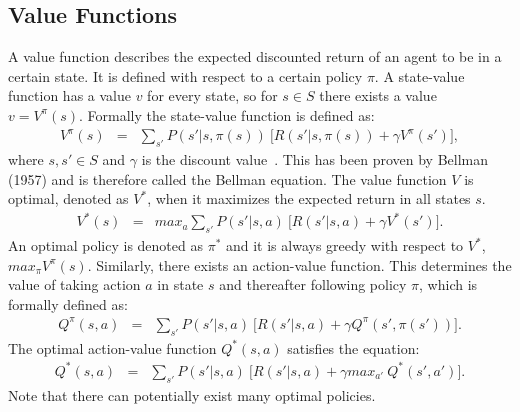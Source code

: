 \subsection{Value Functions}
A value function describes the expected discounted return of an agent to be in a certain
state. It is defined with respect to a certain policy $\pi$. A state-value
function has a value $v$ for every state, so for $s \in S$ there exists a value
$v = V^\pi(s)$. Formally the state-value function is defined as:
\begin{eqnarray}
V^\pi(s) & = & \sum_{s'} P(s'|s,\pi(s)) ~ \Big[R(s'|s,\pi(s)) + \gamma V^\pi(s')\Big],
\end{eqnarray}
where $s,s' \in S$ and $\gamma$ is the discount value~\cite{sutton}. This has
been proven by Bellman (1957) and is therefore called the Bellman equation. The
value function $V$ is optimal, denoted as $V^*$, when it maximizes the expected
return in all states $s$.
\begin{eqnarray}
V^*(s) & = & max_a \sum_{s'} P(s'|s,a) ~ \Big[R(s'|s,a) + \gamma V^*(s')\Big].
\end{eqnarray}
An optimal policy is denoted as $\pi^*$ and it is always greedy with respect to
$V^*$, $max_\pi V^\pi(s)$.  Similarly, there exists an action-value function.
This determines the value of taking action $a$ in state $s$ and thereafter
following policy $\pi$, which is formally defined as:
\begin{eqnarray}
Q^\pi(s,a) & = & \sum_{s'} P(s'|s,a) ~ \Big[R(s'|s,a) + \gamma Q^\pi(s',\pi(s'))\Big].
\end{eqnarray}
The optimal action-value function $Q^*(s,a)$ satisfies the equation:
\begin{eqnarray}
Q^*(s,a) & = & \sum_{s'} P(s'|s,a) ~ \Big[R(s'|s,a) + \gamma max_{a'}~Q^*(s',a')\Big].
\end{eqnarray}
Note that there can potentially exist many optimal policies.

